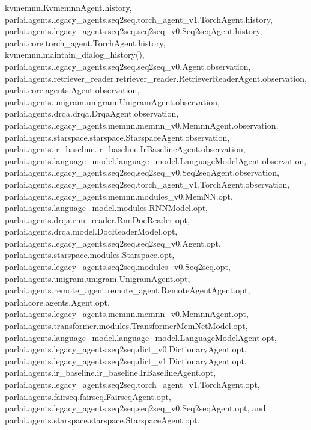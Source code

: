 kvmemnn.\+Kvmemnn\+Agent.\+history, parlai.\+agents.\+legacy\+\_\+agents.\+seq2seq.\+torch\+\_\+agent\+\_\+v1.\+Torch\+Agent.\+history, parlai.\+agents.\+legacy\+\_\+agents.\+seq2seq.\+seq2seq\+\_\+v0.\+Seq2seq\+Agent.\+history, parlai.\+core.\+torch\+\_\+agent.\+Torch\+Agent.\+history, kvmemnn.\+maintain\+\_\+dialog\+\_\+history(), parlai.\+agents.\+legacy\+\_\+agents.\+seq2seq.\+seq2seq\+\_\+v0.\+Agent.\+observation, parlai.\+agents.\+retriever\+\_\+reader.\+retriever\+\_\+reader.\+Retriever\+Reader\+Agent.\+observation, parlai.\+core.\+agents.\+Agent.\+observation, parlai.\+agents.\+unigram.\+unigram.\+Unigram\+Agent.\+observation, parlai.\+agents.\+drqa.\+drqa.\+Drqa\+Agent.\+observation, parlai.\+agents.\+legacy\+\_\+agents.\+memnn.\+memnn\+\_\+v0.\+Memnn\+Agent.\+observation, parlai.\+agents.\+starspace.\+starspace.\+Starspace\+Agent.\+observation, parlai.\+agents.\+ir\+\_\+baseline.\+ir\+\_\+baseline.\+Ir\+Baseline\+Agent.\+observation, parlai.\+agents.\+language\+\_\+model.\+language\+\_\+model.\+Language\+Model\+Agent.\+observation, parlai.\+agents.\+legacy\+\_\+agents.\+seq2seq.\+seq2seq\+\_\+v0.\+Seq2seq\+Agent.\+observation, parlai.\+agents.\+legacy\+\_\+agents.\+seq2seq.\+torch\+\_\+agent\+\_\+v1.\+Torch\+Agent.\+observation, parlai.\+agents.\+legacy\+\_\+agents.\+memnn.\+modules\+\_\+v0.\+Mem\+N\+N.\+opt, parlai.\+agents.\+language\+\_\+model.\+modules.\+R\+N\+N\+Model.\+opt, parlai.\+agents.\+drqa.\+rnn\+\_\+reader.\+Rnn\+Doc\+Reader.\+opt, parlai.\+agents.\+drqa.\+model.\+Doc\+Reader\+Model.\+opt, parlai.\+agents.\+legacy\+\_\+agents.\+seq2seq.\+seq2seq\+\_\+v0.\+Agent.\+opt, parlai.\+agents.\+starspace.\+modules.\+Starspace.\+opt, parlai.\+agents.\+legacy\+\_\+agents.\+seq2seq.\+modules\+\_\+v0.\+Seq2seq.\+opt, parlai.\+agents.\+unigram.\+unigram.\+Unigram\+Agent.\+opt, parlai.\+agents.\+remote\+\_\+agent.\+remote\+\_\+agent.\+Remote\+Agent\+Agent.\+opt, parlai.\+core.\+agents.\+Agent.\+opt, parlai.\+agents.\+legacy\+\_\+agents.\+memnn.\+memnn\+\_\+v0.\+Memnn\+Agent.\+opt, parlai.\+agents.\+transformer.\+modules.\+Transformer\+Mem\+Net\+Model.\+opt, parlai.\+agents.\+language\+\_\+model.\+language\+\_\+model.\+Language\+Model\+Agent.\+opt, parlai.\+agents.\+legacy\+\_\+agents.\+seq2seq.\+dict\+\_\+v0.\+Dictionary\+Agent.\+opt, parlai.\+agents.\+legacy\+\_\+agents.\+seq2seq.\+dict\+\_\+v1.\+Dictionary\+Agent.\+opt, parlai.\+agents.\+ir\+\_\+baseline.\+ir\+\_\+baseline.\+Ir\+Baseline\+Agent.\+opt, parlai.\+agents.\+legacy\+\_\+agents.\+seq2seq.\+torch\+\_\+agent\+\_\+v1.\+Torch\+Agent.\+opt, parlai.\+agents.\+fairseq.\+fairseq.\+Fairseq\+Agent.\+opt, parlai.\+agents.\+legacy\+\_\+agents.\+seq2seq.\+seq2seq\+\_\+v0.\+Seq2seq\+Agent.\+opt, and parlai.\+agents.\+starspace.\+starspace.\+Starspace\+Agent.\+opt.

